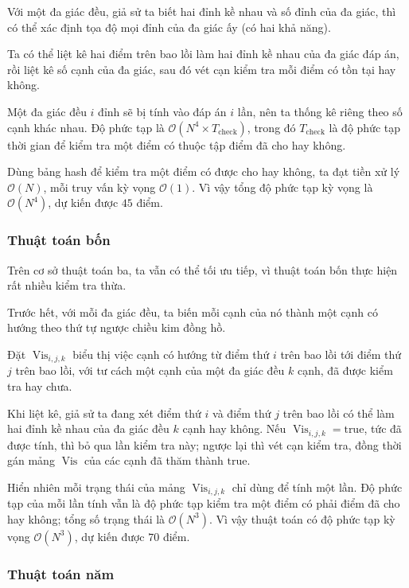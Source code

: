 \documentclass[11pt]{article}
\newcommand{\Oh}{\mathcal{O}}
\begin{document}
Với một đa giác đều, giả sử ta biết hai đỉnh kề nhau và số đỉnh của đa giác,
thì có thể xác định tọa độ mọi đỉnh của đa giác ấy (có hai khả năng).

Ta có thể liệt kê hai điểm trên bao lồi làm hai đỉnh kề nhau của đa giác đáp
án, rồi liệt kê số cạnh của đa giác, sau đó vét cạn kiểm tra mỗi điểm có tồn
tại hay không.

Một đa giác đều \(i\) đỉnh sẽ bị tính vào đáp án \(i\) lần, nên ta thống kê
riêng theo số cạnh khác nhau. Độ phức tạp là
\(\Oh(N^4\times T_{\text{check}})\), trong đó \(T_{\text{check}}\) là độ phức
tạp thời gian để kiểm tra một điểm có thuộc tập điểm đã cho hay không.

Dùng bảng hash để kiểm tra một điểm có được cho hay không, ta đạt tiền xử lý
\(\Oh(N)\), mỗi truy vấn kỳ vọng \(\Oh(1)\). Vì vậy tổng độ phức tạp kỳ vọng
là \(\Oh(N^4)\), dự kiến được \(45\) điểm.

\subsubsection{Thuật toán bốn}

Trên cơ sở thuật toán ba, ta vẫn có thể tối ưu tiếp, vì thuật toán bốn thực
hiện rất nhiều kiểm tra thừa.

Trước hết, với mỗi đa giác đều, ta biến mỗi cạnh của nó thành một cạnh có
hướng theo thứ tự ngược chiều kim đồng hồ.

Đặt \(\operatorname{Vis}_{i,j,k}\) biểu thị việc cạnh có hướng từ điểm thứ
\(i\) trên bao lồi tới điểm thứ \(j\) trên bao lồi, với tư cách một cạnh của
một đa giác đều \(k\) cạnh, đã được kiểm tra hay chưa.

Khi liệt kê, giả sử ta đang xét điểm thứ \(i\) và điểm thứ \(j\) trên bao lồi
có thể làm hai đỉnh kề nhau của đa giác đều \(k\) cạnh hay không. Nếu
\(\operatorname{Vis}_{i,j,k}=\text{true}\), tức đã được tính, thì bỏ qua lần
kiểm tra này; ngược lại thì vét cạn kiểm tra, đồng thời gán mảng
\(\operatorname{Vis}\) của các cạnh đã thăm thành \(\text{true}\).

Hiển nhiên mỗi trạng thái của mảng \(\operatorname{Vis}_{i,j,k}\) chỉ dùng để
tính một lần. Độ phức tạp của mỗi lần tính vẫn là độ phức tạp kiểm tra một
điểm có phải điểm đã cho hay không; tổng số trạng thái là \(\Oh(N^3)\). Vì
vậy thuật toán có độ phức tạp kỳ vọng \(\Oh(N^3)\), dự kiến được \(70\) điểm.

\subsubsection{Thuật toán năm}
\end{document}
